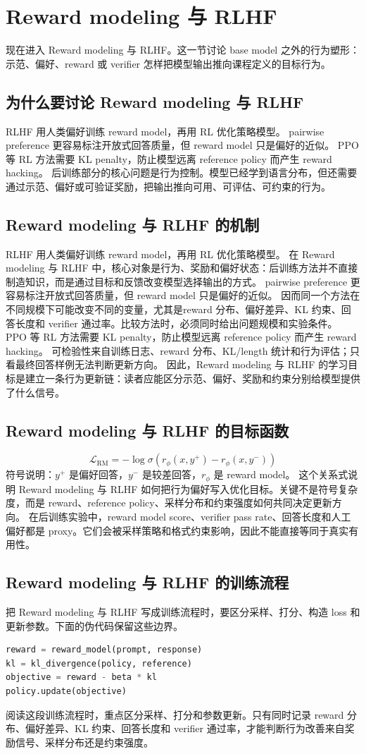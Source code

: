 \documentclass[a4paper]{article}
\begin{document}
\section{Reward modeling 与 RLHF}
现在进入 Reward modeling 与 RLHF。这一节讨论 base model 之外的行为塑形：示范、偏好、reward 或 verifier 怎样把模型输出推向课程定义的目标行为。
\subsection{为什么要讨论 Reward modeling 与 RLHF}
RLHF 用人类偏好训练 reward model，再用 RL 优化策略模型。
pairwise preference 更容易标注开放式回答质量，但 reward model 只是偏好的近似。
PPO 等 RL 方法需要 KL penalty，防止模型远离 reference policy 而产生 reward hacking。
后训练部分的核心问题是行为控制。模型已经学到语言分布，但还需要通过示范、偏好或可验证奖励，把输出推向可用、可评估、可约束的行为。
\subsection{Reward modeling 与 RLHF 的机制}
RLHF 用人类偏好训练 reward model，再用 RL 优化策略模型。 在 Reward modeling 与 RLHF 中，核心对象是行为、奖励和偏好状态：后训练方法并不直接制造知识，而是通过目标和反馈改变模型选择输出的方式。
pairwise preference 更容易标注开放式回答质量，但 reward model 只是偏好的近似。 因而同一个方法在不同规模下可能改变不同的变量，尤其是reward 分布、偏好差异、KL 约束、回答长度和 verifier 通过率。比较方法时，必须同时给出问题规模和实验条件。
PPO 等 RL 方法需要 KL penalty，防止模型远离 reference policy 而产生 reward hacking。 可检验性来自训练日志、reward 分布、KL/length 统计和行为评估；只看最终回答样例无法判断更新方向。
因此，Reward modeling 与 RLHF 的学习目标是建立一条行为更新链：读者应能区分示范、偏好、奖励和约束分别给模型提供了什么信号。
\subsection{Reward modeling 与 RLHF 的目标函数}
\[\mathcal{L}_{\text{RM}}=-\log\sigma(r_\phi(x,y^+)-r_\phi(x,y^-))\]
符号说明：\(y^+\) 是偏好回答，\(y^-\) 是较差回答，\(r_\phi\) 是 reward model。
这个关系式说明 Reward modeling 与 RLHF 如何把行为偏好写入优化目标。关键不是符号复杂度，而是 reward、reference policy、采样分布和约束强度如何共同决定更新方向。
在后训练实验中，reward model score、verifier pass rate、回答长度和人工偏好都是 proxy。它们会被采样策略和格式约束影响，因此不能直接等同于真实有用性。
\subsection{Reward modeling 与 RLHF 的训练流程}
把 Reward modeling 与 RLHF 写成训练流程时，要区分采样、打分、构造 loss 和更新参数。下面的伪代码保留这些边界。
\begin{lstlisting}[language=Python]
reward = reward_model(prompt, response)
kl = kl_divergence(policy, reference)
objective = reward - beta * kl
policy.update(objective)
\end{lstlisting}
阅读这段训练流程时，重点区分采样、打分和参数更新。只有同时记录 reward 分布、偏好差异、KL 约束、回答长度和 verifier 通过率，才能判断行为改善来自奖励信号、采样分布还是约束强度。
\end{document}
